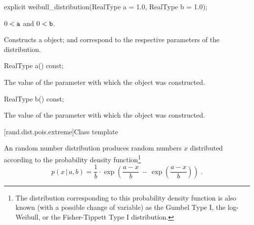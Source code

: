%
\begin{itemdecl}
explicit weibull_distribution(RealType a = 1.0, RealType b = 1.0);
\end{itemdecl}%

\begin{itemdescr}
\pnum\requires
 $ 0 < \texttt{a} $ and  $ 0 < \texttt{b} $.

\pnum\effects Constructs a  object;
  and 
 correspond to the respective parameters of the distribution.
\end{itemdescr}

%
%
\begin{itemdecl}
RealType a() const;
\end{itemdecl}

\begin{itemdescr}
\pnum\returns The value of the  parameter
 with which the object was constructed.
\end{itemdescr}

%
%
\begin{itemdecl}
RealType b() const;
\end{itemdecl}

\begin{itemdescr}
\pnum\returns The value of the  parameter
 with which the object was constructed.
\end{itemdescr}


[rand.dist.pois.extreme]{Class template }

\pnum
An  random number distribution
produces random numbers $x$
distributed according to
the probability density function\footnote{The distribution corresponding to
 this probability density function
 is also known
 (with a possible change of variable)
 as the Gumbel Type I,
 the log-Weibull,
 or the Fisher-Tippett Type I
 distribution.}%
%
\[%
 p(x\,|\,a,b)
      =       \frac{1}{b}
        \cdot \exp\left(  \frac{a-x}{b}
                       \,-\, \exp\left(\frac{a-x}{b}\right)
                  \right)
\; \mbox{.}
\]

